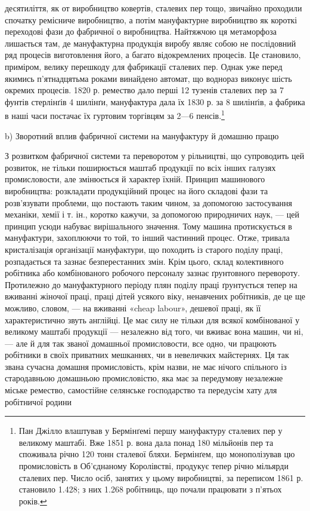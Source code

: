 \parcont{}  %
десятиліття, як от виробництво ковертів, сталевих пер тощо, звичайно
проходили спочатку ремісниче виробництво, а потім мануфактурне
виробництво як короткі переходові фази до фабричної о
виробництва. Найтяжчою ця метаморфоза лишається там, де мануфактурна
продукція виробу являє собою не послідовний ряд процесів
виготовлення його, а багато відокремлених процесів. Це становило,
приміром, велику перешкоду для фабрикації сталевих пер.
Однак уже перед якимись п’ятнадцятьма роками винайдено автомат,
що воднораз виконує шість окремих процесів. 1820 р. ремество
дало перші 12 тузенів сталевих пер за 7 фунтів стерлінґів 4 шилінґи,
мануфактура дала їх 1830 р. за 8 шилінґів, а фабрика в
наші часи постачає їх гуртовим торгівцям за 2—6 пенсів.\footnote{
Пан Джілло влаштував у Бермінґемі першу мануфактуру сталевих
пер у великому маштабі. Вже 1851 р. вона дала понад 180 мільйонів пер
та споживала річно 120 тонн сталевої бляхи. Бермінґем, що монополізував
цю промисловість в Об’єднаному Королівстві, продукує тепер річно
мільярди сталевих пер. Число осіб, занятих у цьому виробництві, за
переписом 1861 р. становило 1.428; з них 1.268 робітниць, що почали
працювати з п’ятьох років.
}

b) Зворотний вплив фабричної системи
на мануфактуру й домашню працю

З розвитком фабричної системи та переворотом у рільництві, що
супроводить цей розвиток, не тільки поширюється маштаб продукції
по всіх інших галузях промисловости, але змінюється й характер
їхній. Принцип машинового виробництва: розкладати продукційний
процес на його складові фази та розв’язувати проблеми,
що постають таким чином, за допомогою застосування механіки,
хемії і т. ін., коротко кажучи, за допомогою природничих наук, —
цей принцип усюди набуває вирішального значення. Тому машина
протискується в мануфактури, захоплюючи то той, то інший
частинний процес. Отже, тривала кристалізація організації мануфактури,
що походить із старого поділу праці, розпадається
та зазнає безперестанних змін. Крім цього, склад колективного
робітника або комбінованого робочого персоналу зазнає ґрунтовного
перевороту. Протилежно до мануфактурного періоду
плян поділу праці ґрунтується тепер на вживанні жіночої праці,
праці дітей усякого віку, ненавчених робітників, де це ще
можливо, словом, — на вживанні «cheap labour», дешевої праці,
як її характеристично звуть англійці. Це має силу не тільки для
всякої комбінованої у великому маштабі продукції — незалежно
від того, чи вживає вона машин, чи ні, — але й для так званої
домашньої промисловости, все одно, чи працюють робітники в
своїх приватних мешканнях, чи в невеличких майстернях. Ця
так звана сучасна домашня промисловість, крім назви, не має
нічого спільного із стародавньою домашньою промисловістю,
яка має за передумову незалежне міське ремество, самостійне
селянське господарство та передусім хату для робітничої родини
\parbreak{}  %
